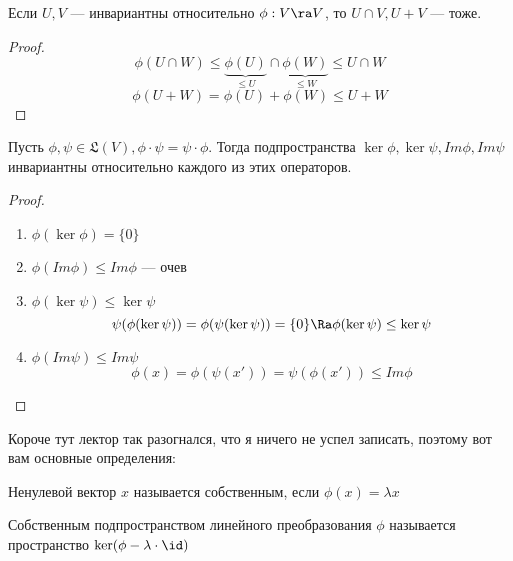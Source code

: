 \begin{proposition}
    Если \(U, V\) --- инвариантны относительно \(\phi: V \ra V\), то \(U \cap V, U + V\) --- тоже.
\end{proposition}
\begin{proof}
    \[\phi(U \cap W) \le \underbrace{\phi(U)}_{\le U}  \cap \underbrace{\phi(W)}_{\le W} \le U \cap W\]
    \[\phi(U + W) = \phi(U) + \phi(W) \le U + W\]
\end{proof}

\begin{proposition}
    Пусть \(\phi, \psi \in \mathfrak{L}(V), \phi \cdot \psi = \psi \cdot \phi\). Тогда подпространства \(\ker \phi, \ker \psi, Im\phi, Im\psi\) инвариантны относительно каждого из этих операторов.
\end{proposition}
\begin{proof}
    \begin{enumerate}
        \item \(\phi(\ker \phi) = \{0\}\)
        \item \(\phi(Im \phi) \le Im \phi\) ---  очев
        \item \(\phi(\ker \psi) \le \ker \psi\)
        \[\psi(\phi(\ker\psi)) = \phi(\psi(\ker\psi)) = \{0\} \Ra \phi(\ker \psi) \le \ker\psi\]
        \item \(\phi(Im \psi) \le Im \psi\)
        \[\phi(x) = \phi(\psi(x')) = \psi(\phi(x')) \le Im \phi\]
    \end{enumerate}
\end{proof}

Короче тут лектор так разогнался, что я ничего не успел записать, поэтому вот вам основные определения:
\begin{definition}
    Ненулевой вектор \(x\) называется собственным, если \(\phi(x) = \lambda x\)
\end{definition}
\begin{definition}
    Собственным подпространством линейного преобразования \(\phi\) называется пространство \(\ker(\phi - \lambda \cdot \id)\)
\end{definition}